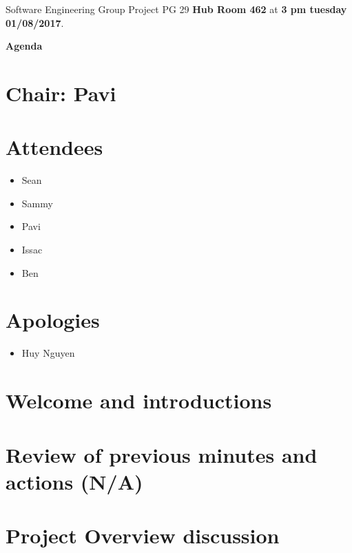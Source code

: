 \documentclass[11pt, a4paper]{article}
\begin{document}
\noindent Software Engineering Group Project PG 29 {\bf Hub Room 462} at {\bf 3 pm tuesday 01/08/2017}.
\vspace*{10pt}
\begin{center}
\huge \bf Agenda
\end{center}

\section*{Chair: Pavi}

\vspace*{10pt}

\section{Attendees}
\begin{itemize}
\item Sean
\item Sammy
\item Pavi
\item Issac
\item Ben
\end{itemize}
\section{Apologies}
\begin{itemize}
\item Huy Nguyen
\end{itemize}

\section{Welcome and introductions}

\section{Review of previous minutes and actions (N/A)}

\section{Project Overview discussion}
\end{document}
